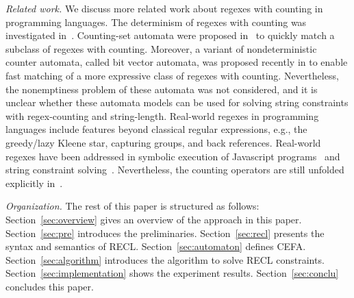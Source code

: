 \medskip
\noindent
\emph{Related work.} 
We discuss more related work about regexes with counting in programming languages.  
The determinism of regexes with counting was investigated in~\cite{GGM12,CL15}. Counting-set automata were proposed in~\cite{redos_lenka,HS+23} to quickly match a subclass of regexes with counting. Moreover, a variant of nondeterministic counter automata, called bit vector automata, was proposed recently in \cite{GKM23} to enable fast matching of a more expressive class of regexes with counting.   Nevertheless, the nonemptiness problem of these automata was not considered, and it is unclear whether these automata models can be used for solving string constraints with regex-counting and string-length.
Real-world regexes in programming languages include features beyond classical regular expressions, e.g., the greedy/lazy Kleene star, capturing groups, and back references. Real-world regexes have been addressed in symbolic execution of Javascript programs~\cite{LMK19} and string constraint solving~\cite{CF+22}. Nevertheless, the counting operators are still unfolded explicitly in~\cite{CF+22}.  


\smallskip
\noindent
\emph{Organization.} 
The rest of this paper is structured as follows: Section~\ref{sec:overview} gives an overview of the approach in this paper. Section~\ref{sec:pre} introduces the preliminaries. 
Section~\ref{sec:recl} presents the syntax and semantics of RECL. 
Section~\ref{sec:automaton} defines CEFA. Section~\ref{sec:algorithm} introduces the algorithm to solve RECL constraints. Section~\ref{sec:implementation} shows the experiment results. Section~\ref{sec:conclu} concludes this paper.


